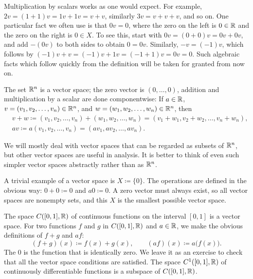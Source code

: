 Multiplication by scalars works as one would expect.
For example, $2v = (1+1)v = 1v + 1v = v+v$, similarly $3v = v+v+v$, and
so on.  
One particular fact we often use is that $0 v = 0$, where
the zero on the left is $0 \in {\mathbb{R}}$ and the zero on the right is $0 \in X$.
To see this, start with
$0v = (0+0)v = 0v + 0v$, and add $-(0v)$ to both sides
to obtain $0 = 0v$.  Similarly, $-v = (-1)v$, which follows by
$(-1)v+v = (-1)v + 1v = (-1+1)v = 0v = 0$.
Such algebraic facts which follow quickly from the definition will be taken
for granted from now on.

\begin{example}
The set ${\mathbb{R}}^n$ is a vector space;
the zero vector is $(0,\ldots,0)$, addition
and multiplication by a scalar are done componentwise:
If $a \in {\mathbb{R}}$, $v = (v_1,v_2,\ldots,v_n) \in {\mathbb{R}}^n$, and $w =
(w_1,w_2,\ldots,w_n) \in {\mathbb{R}}^n$, then
\begin{align*}
& v+w \coloneqq
(v_1,v_2,\ldots,v_n) +
(w_1,w_2,\ldots,w_n) 
=
(v_1+w_1,v_2+w_2,\ldots,v_n+w_n) , \\
& a v \coloneqq
a (v_1,v_2,\ldots,v_n) =
(a v_1, a v_2,\ldots, a v_n) .
\end{align*}
\end{example}

We will mostly deal with  vector spaces that can
be regarded as subsets of ${\mathbb{R}}^n$, but other vector spaces are useful in
analysis.
It is better to think of even such simpler
vector spaces abstractly rather than as ${\mathbb{R}}^n$.

\begin{example}
A trivial example of a vector space is
$X \coloneqq \{ 0 \}$.  The operations are defined in the obvious way:
$0 + 0 \coloneqq 0$ and $a0 \coloneqq 0$.  A zero vector must always exist,
so all vector spaces are nonempty sets, and this $X$ is the smallest
possible vector space.
\end{example}

\begin{example}
The space $C([0,1],{\mathbb{R}})$ of continuous functions on the interval $[0,1]$
is a vector space.  For two functions $f$ and $g$ in $C([0,1],{\mathbb{R}})$ and
$a \in {\mathbb{R}}$, we make the obvious definitions of $f+g$ and $af$:
\begin{equation*}
(f+g)(x) \coloneqq f(x) + g(x), \qquad (af) (x) \coloneqq a\bigl(f(x)\bigr) .
\end{equation*}
The 0 is the function that is identically zero.  We leave it as an exercise
to check that all the vector space conditions are satisfied.
The space $C^1([0,1],{\mathbb{R}})$ of continuously differentiable functions is
a subspace of $C([0,1],{\mathbb{R}})$.
\end{example}

